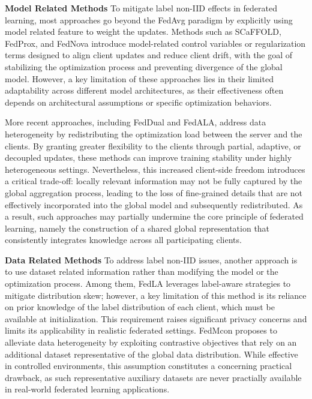 \documentclass[runningheads]{llncs}
\begin{document}
\textbf{Model Related Methods} To mitigate label non-IID effects in federated learning, most approaches go beyond the FedAvg paradigm by explicitly using model related feature to weight the updates. Methods such as SCaFFOLD, FedProx, and FedNova introduce model-related control variables or regularization terms designed to align client updates and reduce client drift, with the goal of stabilizing the optimization process and preventing divergence of the global model. However, a key limitation of these approaches lies in their limited adaptability across different model architectures, as their effectiveness often depends on architectural assumptions or specific optimization behaviors.

More recent approaches, including FedDual and FedALA, address data heterogeneity by redistributing the optimization load between the server and the clients. By granting greater flexibility to the clients through partial, adaptive, or decoupled updates, these methods can improve training stability under highly heterogeneous settings. Nevertheless, this increased client-side freedom introduces a critical trade-off: locally relevant information may not be fully captured by the global aggregation process, leading to the loss of fine-grained details that are not effectively incorporated into the global model and subsequently redistributed. As a result, such approaches may partially undermine the core principle of federated learning, namely the construction of a shared global representation that consistently integrates knowledge across all participating clients.

\textbf{Data Related Methods} To address label non-IID issues, another approach is to use dataset related information rather than modifying the model or the optimization process. Among them, FedLA leverages label-aware strategies to mitigate distribution skew; however, a key limitation of this method is its reliance on prior knowledge of the label distribution of each client, which must be available at initialization. This requirement raises significant privacy concerns and limits its applicability in realistic federated settings.
FedMcon proposes to alleviate data heterogeneity by exploiting contrastive objectives that rely on an additional dataset representative of the global data distribution. While effective in controlled environments, this assumption constitutes a concerning practical drawback, as such representative auxiliary datasets are never practially available in real-world federated learning applications. 
\end{document}
